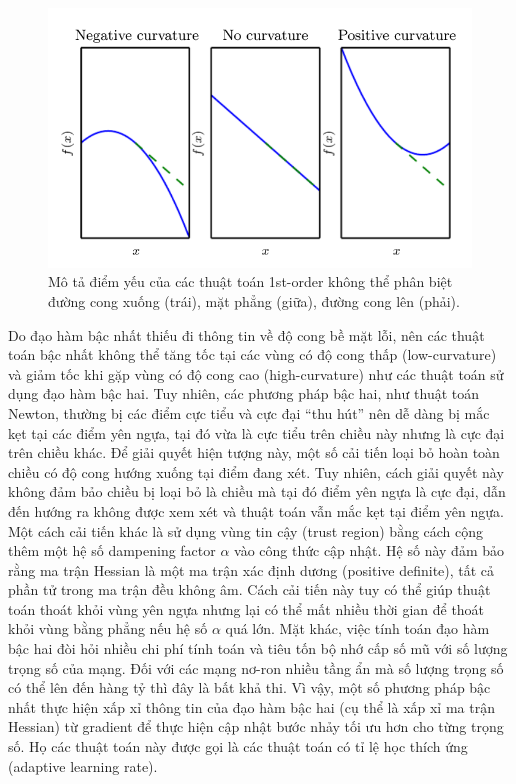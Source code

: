 \begin{figure}[htp]
\centering
\includegraphics[width=120 mm]{images/hessian.png}
\caption{Mô tả điểm yếu của các thuật toán 1st-order không thể phân biệt đường cong xuống (trái), mặt phẳng (giữa), đường cong lên (phải). \cite{goodfellow2016deeplearning}}
\label{fig:hessian}
\end{figure}

Do đạo hàm bậc nhất thiếu đi thông tin về độ cong bề mặt lỗi, nên các thuật toán bậc nhất không thể tăng tốc tại các vùng có độ cong thấp (low-curvature) và giảm tốc khi gặp vùng có độ cong cao (high-curvature) như các thuật toán sử dụng đạo hàm bậc hai. Tuy nhiên, các phương pháp bậc hai, như thuật toán Newton, thường bị các điểm cực tiểu và cực đại ``thu hút'' nên dễ dàng bị mắc kẹt tại các điểm yên ngựa, tại đó vừa là cực tiểu trên chiều này nhưng là cực đại trên chiều khác. Để giải quyết hiện tượng này, một số cải tiến loại bỏ hoàn toàn chiều có độ cong hướng xuống tại điểm đang xét. Tuy nhiên, cách giải quyết này không đảm bảo chiều bị loại bỏ là chiều mà tại đó điểm yên ngựa là cực đại, dẫn đến hướng ra không được xem xét và thuật toán vẫn mắc kẹt tại điểm yên ngựa. Một cách cải tiến khác là sử dụng vùng tin cậy (trust region) bằng cách cộng thêm một hệ số dampening factor $\alpha$ vào công thức cập nhật. Hệ số này đảm bảo rằng ma trận Hessian là một ma trận xác định dương (positive definite), tất cả phần tử trong ma trận đều không âm. Cách cải tiến này tuy có thể giúp thuật toán thoát khỏi vùng yên ngựa nhưng lại có thể mất nhiều thời gian để thoát khỏi vùng bằng phẳng nếu hệ số $\alpha$ quá lớn. Mặt khác, việc tính toán đạo hàm bậc hai đòi hỏi nhiều chi phí tính toán và tiêu tốn bộ nhớ cấp số mũ với số lượng trọng số của mạng. Đối với các mạng nơ-ron nhiều tầng ẩn mà số lượng trọng số có thể lên đến hàng tỷ thì đây là bất khả thi. Vì vậy, một số phương pháp bậc nhất thực hiện xấp xỉ thông tin của đạo hàm bậc hai (cụ thể là xấp xỉ ma trận Hessian) từ gradient để thực hiện cập nhật bước nhảy tối ưu hơn cho từng trọng số. Họ các thuật toán này được gọi là các thuật toán có tỉ lệ học thích ứng (adaptive learning rate).


